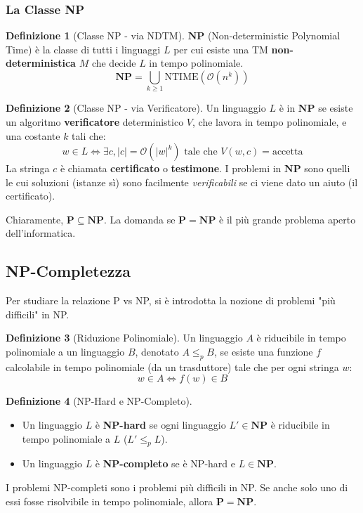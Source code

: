 \documentclass[a4paper]{article}
\theoremstyle{definition} %
\newtheorem{definition}{Definizione}
\newcommand{\bigO}[1]{\mathcal{O}(#1)}
\newcommand{\reducep}{\le_p}
\begin{document}
\subsubsection{La Classe NP}
\begin{definition}[Classe NP - via NDTM]
$\mathbf{NP}$ (Non-deterministic Polynomial Time) è la classe di tutti i linguaggi $L$ per cui esiste una TM \textbf{non-deterministica} $M$ che decide $L$ in tempo polinomiale.
$$ \mathbf{NP} = \bigcup_{k \ge 1} \text{NTIME}(\bigO{n^k}) $$
\end{definition}
\begin{definition}[Classe NP - via Verificatore]
Un linguaggio $L$ è in $\mathbf{NP}$ se esiste un algoritmo \textbf{verificatore} deterministico $V$, che lavora in tempo polinomiale, e una costante $k$ tali che:
$$ w \in L \iff \exists c, |c| = \bigO{|w|^k} \text{ tale che } V(w, c) = \text{accetta} $$
La stringa $c$ è chiamata \textbf{certificato} o \textbf{testimone}. I problemi in $\mathbf{NP}$ sono quelli le cui soluzioni (istanze sì) sono facilmente \emph{verificabili} se ci viene dato un aiuto (il certificato).
\end{definition}
Chiaramente, $\mathbf{P} \subseteq \mathbf{NP}$. La domanda se $\mathbf{P} = \mathbf{NP}$ è il più grande problema aperto dell'informatica.

\subsection{NP-Completezza}
Per studiare la relazione P vs NP, si è introdotta la nozione di problemi "più difficili" in NP.
\begin{definition}[Riduzione Polinomiale]
Un linguaggio $A$ è riducibile in tempo polinomiale a un linguaggio $B$, denotato $A \reducep B$, se esiste una funzione $f$ calcolabile in tempo polinomiale (da un trasduttore) tale che per ogni stringa $w$:
$$ w \in A \iff f(w) \in B $$
\end{definition}
\begin{definition}[NP-Hard e NP-Completo]
\begin{itemize}
    \item Un linguaggio $L$ è \textbf{NP-hard} se ogni linguaggio $L' \in \mathbf{NP}$ è riducibile in tempo polinomiale a $L$ ($L' \reducep L$).
    \item Un linguaggio $L$ è \textbf{NP-completo} se è NP-hard e $L \in \mathbf{NP}$.
\end{itemize}
\end{definition}
I problemi NP-completi sono i problemi più difficili in NP. Se anche solo uno di essi fosse risolvibile in tempo polinomiale, allora $\mathbf{P} = \mathbf{NP}$.
\end{document}
